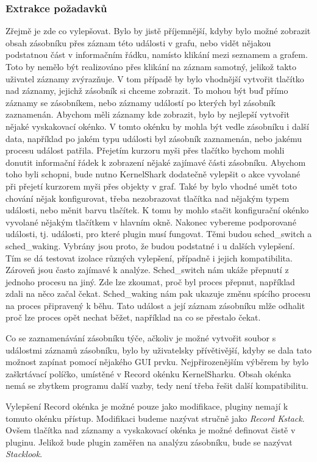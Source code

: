 \subsubsection*{Extrakce požadavků}
Zřejmě je zde co vylepšovat. Bylo by jistě příjemnější, kdyby bylo možné zobrazit obsah zásobníku přes záznam této události v grafu, nebo vidět nějakou podstatnou část v informačním řádku, namísto klikání mezi seznamem a grafem. Toto by nemělo být realizováno přes klikání na záznam samotný, jelikož takto uživatel záznamy zvýrazňuje. V tom případě by bylo vhodnější vytvořit tlačítko nad záznamy, jejichž zásobník si chceme zobrazit. To mohou být buď přímo záznamy se zásobníkem, nebo záznamy událostí po kterých byl zásobník zaznamenán. Abychom měli záznamy kde zobrazit, bylo by nejlepší vytvořit nějaké vyskakovací okénko. V tomto okénku by mohla být vedle zásobníku i další data, například po jakém typu události byl zásobník zaznamenán, nebo jakému procesu událost patřila. Přejetím kurzoru myši přes tlačítko bychom mohli donutit informační řádek k zobrazení nějaké zajímavé části zásobníku. Abychom toho byli schopni, bude nutno KernelShark dodatečně vylepšit o akce vyvolané při přejetí kurzorem myši přes objekty v graf. Také by bylo vhodné umět toto chování nějak konfigurovat, třeba nezobrazovat tlačítka nad nějakým typem události, nebo měnit barvu tlačítek. K tomu by mohlo stačit konfigurační okénko vyvolané nějakým tlačítkem v hlavním okně. Nakonec vybereme podporované události, tj. události, pro které plugin musí fungovat. Těmi budou sched\_switch a sched\_waking. Vybrány jsou proto, že budou podstatné i u dalších vylepšení. Tím se dá testovat izolace různých vylepšení, případně i jejich kompatibilita. Zároveň jsou často zajímavé k analýze. Sched\_switch nám ukáže přepnutí z jednoho procesu na jiný. Zde lze zkoumat, proč byl proces přepnut, například zdali na něco začal čekat. Sched\_waking nám pak ukazuje změnu spícího procesu na proces připravený k běhu. Tato událost a její záznam zásobníku mlže odhalit proč lze proces opět nechat běžet, například na co se přestalo čekat.

Co se zaznamenávání zásobníku týče, ačkoliv je možné vytvořit soubor s událostmi záznamů zásobníku, bylo by uživatelsky přívětivější, kdyby se dala tato možnost zapínat pomocí nějakého GUI prvku. Nejpřirozenějším výběrem by bylo zaškrtávací políčko, umístěné v Record okénku KernelSharku. Obsah okénka nemá se zbytkem programu další vazby, tedy není třeba řešit další kompatibilitu.   

Vylepšení Record okénka je možné pouze jako modifikace, pluginy nemají k tomuto okénku přístup. Modifikaci budeme nazývat stručně jako \emph{Record Kstack}. Ovšem tlačítka nad záznamy a vyskakovací okénka je možné definovat čistě v pluginu. Jelikož bude plugin zaměřen na analýzu zásobníku, bude se nazývat \emph{Stacklook}.

